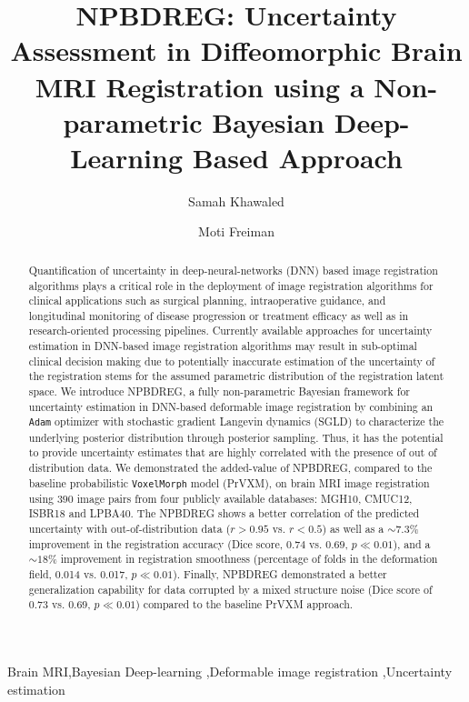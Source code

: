 \documentclass[preprint,authoryear]{elsarticle}
\begin{document}
\begin{frontmatter}

\title{NPBDREG: Uncertainty Assessment in Diffeomorphic Brain MRI Registration using a Non-parametric Bayesian Deep-Learning Based Approach}
\author[1]{Samah Khawaled}
\author[2]{Moti Freiman }


\address[1]{Department of Applied Mathematics, Technion – Israel Institute of Technology, Haifa, Israel}
\address[2]{Faculty of Biomedical Engineering, Technion – Israel Institute of Technology, Haifa, Israel}

\begin{abstract}
	Quantification of uncertainty in deep-neural-networks (DNN) based image registration algorithms plays a critical role in the deployment of image registration algorithms for clinical applications such as surgical planning, intraoperative guidance, and longitudinal monitoring of disease progression or treatment efficacy as well as in research-oriented processing pipelines. Currently available approaches for uncertainty estimation in DNN-based image registration algorithms may result in sub-optimal clinical decision making due to potentially inaccurate estimation of the uncertainty of the registration stems for the assumed parametric distribution of the registration latent space.   
	We introduce NPBDREG, a fully non-parametric Bayesian framework for uncertainty estimation in DNN-based deformable image registration by  combining an \texttt{Adam} optimizer with stochastic gradient Langevin dynamics (SGLD) to characterize the underlying posterior distribution through posterior sampling. Thus, it has the potential to provide uncertainty estimates that are highly correlated with the presence of out of distribution data. We demonstrated the added-value of NPBDREG, compared to the baseline probabilistic \texttt{VoxelMorph} model (PrVXM), on brain MRI image registration using $390$ image pairs from four publicly available databases: MGH10, CMUC12, ISBR18 and LPBA40. The NPBDREG shows  a better correlation of the predicted uncertainty with out-of-distribution data ($r>0.95$ vs. $r<0.5$) as well as a $\sim7.3\%$  improvement in the registration accuracy (Dice score, $0.74$ vs. $0.69$, $p \ll 0.01$), and a $\sim18\%$ improvement in registration smoothness  (percentage of folds in the deformation field, 0.014 vs. 0.017, $p \ll 0.01$).
	Finally, NPBDREG demonstrated a better generalization capability for data corrupted by a mixed structure noise (Dice score of $0.73$ vs. $0.69$, $p \ll 0.01$) compared to the baseline PrVXM approach. 
\end{abstract}
\begin{keyword}
 Brain MRI\sep Bayesian Deep-learning
\sep   Deformable image registration \sep Uncertainty estimation 
\end{keyword}

\end{frontmatter}
\end{document}
